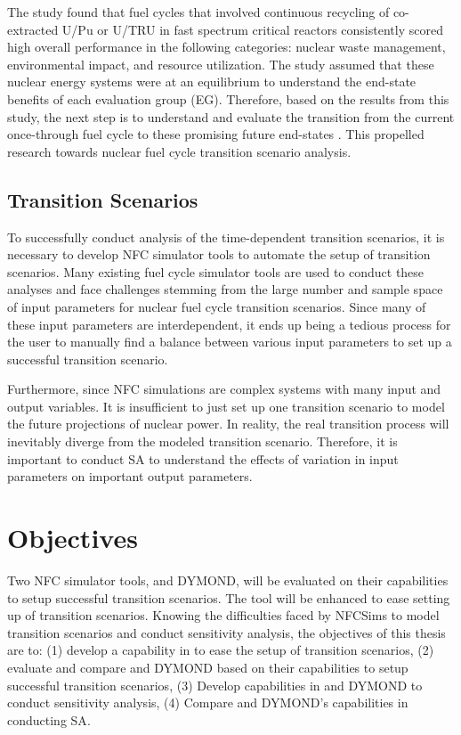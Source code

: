 The study found that fuel cycles that involved continuous recycling
of co-extracted U/Pu or U/TRU in fast spectrum critical reactors
consistently scored high overall performance in the following 
categories: nuclear waste management, environmental impact, 
and resource utilization. 
The study assumed that 
these nuclear energy systems were at an equilibrium to understand 
the end-state benefits of each evaluation group (EG). 
Therefore, based on the results from this study, the next step is 
to understand and evaluate the transition from the current 
once-through fuel cycle to these promising 
future end-states \cite{feng_standardized_2016}. 
This propelled research towards nuclear fuel cycle transition 
scenario analysis. 

\subsection{Transition Scenarios}
To successfully conduct analysis of the time-dependent transition
scenarios, it is necessary to develop \gls{NFC} simulator tools to  
automate the setup of transition scenarios. 
Many existing fuel cycle simulator tools are used to conduct 
these analyses and face challenges stemming from the large 
number and sample space of input 
parameters for nuclear fuel cycle transition scenarios.
Since many of these input parameters are interdependent, it ends
up being a tedious process for the user to manually find a balance 
between various input parameters to set up a successful transition 
scenario. 

Furthermore, since \gls{NFC} simulations are complex systems with 
many input and output variables. 
It is insufficient to just set up one transition scenario to model 
the future projections of nuclear power. 
In reality, the real transition process will 
inevitably diverge from the modeled transition scenario. 
Therefore, it is important to conduct \gls{SA} to understand 
the effects of variation in input parameters on 
important output parameters. 

\section{Objectives}
Two \gls{NFC} simulator tools, \Cyclus and DYMOND, will be evaluated on 
their capabilities to setup successful transition scenarios. 
The \Cyclus tool will be enhanced to ease setting up of 
transition scenarios. 
Knowing the difficulties faced by \glspl{NFCSim} to model 
transition scenarios and conduct sensitivity analysis, 
the objectives of this thesis are to: 
(1) develop a capability in \Cyclus to ease the setup of 
transition scenarios, 
(2) evaluate and compare \Cyclus and 
DYMOND based on their capabilities to setup 
successful transition scenarios,
(3) Develop capabilities in \Cyclus and DYMOND to conduct 
sensitivity analysis,
(4) Compare \Cyclus and DYMOND's capabilities in conducting \gls{SA}. 
